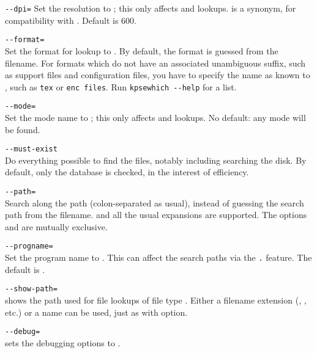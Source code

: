 \documentclass{article}
\begin{document}
\begin{ttdescription}
\item[\texttt{-{}-dpi=\var{num}}]\mbox{} 
  Set the resolution to ; this only affects 
  and  lookups.   is a synonym, for compatibility
  with .  Default is 600.

\item[\texttt{-{}-format=\var{name}}]\mbox{}\\
  Set the format for lookup to .  By default, the
  format is guessed from the filename. For formats which do not have
  an associated unambiguous suffix, such as \MP{} support files and
   configuration files, you have to specify the name as
  known to \KPS{}, such as \texttt{tex} or \texttt{enc files}.  Run
  \texttt{kpsewhich -{}-help} for a list.

\item[\texttt{-{}-mode=\var{string}}]\mbox{}\\
  Set the mode name to ; this only affects 
  and  lookups.  No default: any mode will be found.
\item[\texttt{-{}-must-exist}]\mbox{}\\
  Do everything possible to find the files, notably including
  searching the disk.  By default, only the  database is
  checked, in the interest of efficiency.
\item[\texttt{-{}-path=\var{string}}]\mbox{}\\
  Search along the path  (colon-separated as usual),
  instead of guessing the search path from the filename.  \samp{//} and
  all the usual expansions are supported.  The options 
  and  are mutually exclusive.
\item[\texttt{-{}-progname=\var{name}}]\mbox{}\\
  Set the program name to \texttt{}.
  This can affect the search paths via the \texttt{.}
  feature.
  The default is .
\item[\texttt{-{}-show-path=\var{name}}]\mbox{}\\
  shows the path used for file lookups of file type \texttt{}.
  Either a filename extension (, , etc.) or a
  name can be used, just as with  option.
\item[\texttt{-{}-debug=\var{num}}]\mbox{}\\
  sets the debugging options to \texttt{}.
\end{ttdescription}
\end{document}

